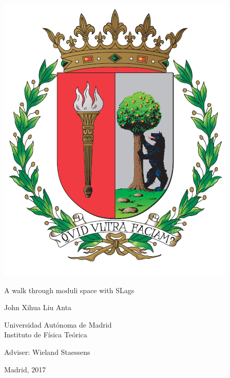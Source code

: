 \thispagestyle{empty}

\begin{center}
\begin{minipage}{1\linewidth}
\centering 
\includegraphics[width=0.3\linewidth]{escudo.PNG}

{}
\vspace{1cm}

{\Huge A walk through moduli space with SLags}
\vspace{2cm}

{\LARGE  John Xihua Liu Anta}
\vspace{8cm}

{\Large Universidad Autónoma de Madrid\\
 Instituto de Física Teórica}
\vspace{1cm}

{\Large Adviser: Wieland Staessens}
\vspace{1cm}

{\Large Madrid, 2017}
 
\end{minipage}
\end{center}
\clearpage
